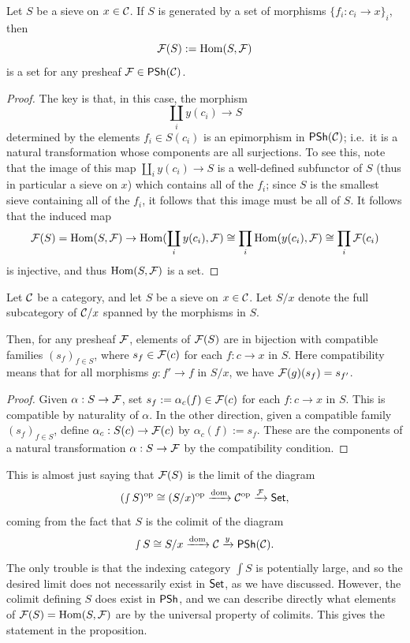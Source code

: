 \begin{proposition}\label{prop:chap:sheaves:sec:sites:FS is a set for small sieves}
    Let $S$ be a sieve on $x \in \catC$. If $S$ is generated by a set of morphisms $\{f_i : c_i \to x\}_i$, then
    \[\cal{F}(S) := \Hom(S,\cal{F})\]
    is a set for any presheaf $\cal{F} \in \PSh(\catC)$.
\end{proposition}
\begin{proof}
    The key is that, in this case, the morphism
    \[\coprod_i y(c_i) \to S\]
    determined by the elements $f_i \in S(c_i)$ is an epimorphism in $\PSh(\catC)$; i.e.\ it is a natural transformation whose components are all surjections. To see this, note that the image of this map $\coprod_i y(c_i) \to S$ is a well-defined subfunctor of $S$ (thus in particular a sieve on $x$) which contains all of the $f_i$; since $S$ is the smallest sieve containing all of the $f_i$, it follows that this image must be all of $S$. It follows that the induced map
    \[\cal{F}(S) = \Hom(S,\cal{F}) \to \Hom(\coprod_i y(c_i),\cal{F}) \cong \prod_i \Hom(y(c_i),\cal{F}) \cong \prod_i \cal{F}(c_i)\]
    is injective, and thus $\Hom(S,\cal{F})$ is a set.
\end{proof}

\begin{proposition}\label{prop:chap:sheaves:sec:sites:sheaf condition as limit}
    Let $\catC$ be a category, and let $S$ be a sieve on $x \in \catC$. Let $S/x$ denote the full subcategory of $\catC/x$ spanned by the morphisms in $S$.

    Then, for any presheaf $\cal{F}$, elements of $\cal{F}(S)$ are in bijection with compatible families $(s_f)_{f \in S}$, where $s_f \in \cal{F}(c)$ for each $f : c \to x$ in $S$. Here compatibility means that for all morphisms $g : f' \to f$ in $S/x$, we have $\cal{F}(g)(s_f) = s_{f'}$.
\end{proposition}
\begin{proof}
    Given $\alpha : S \to \cal{F}$, set $s_f := \alpha_c(f) \in \cal{F}(c)$ for each $f : c \to x$ in $S$. This is compatible by naturality of $\alpha$. In the other direction, given a compatible family $(s_f)_{f \in S}$, define $\alpha_c : S(c) \to \cal{F}(c)$ by $\alpha_c(f) := s_f$. These are the components of a natural transformation $\alpha : S \to \cal{F}$ by the compatibility condition.
\end{proof}

This is almost just saying that $\cal{F}(S)$ is the limit of the diagram
\[(\smallint S)^\op \cong (S/x)^\op \xrightarrow{\dom} \catC^\op \xrightarrow{\cal{F}} \Set,\]
coming from the fact that $S$ is the colimit of the diagram
\[\smallint S \cong S/x \xrightarrow{\dom} \catC \xrightarrow{y} \PSh(\catC).\]
The only trouble is that the indexing category $\int S$ is potentially large, and so the desired limit does not necessarily exist in $\Set$, as we have discussed. However, the colimit defining $S$ does exist in $\PSh$, and we can describe directly what elements of $\cal{F}(S) = \Hom(S,\cal{F})$ are by the universal property of colimits. This gives the statement in the proposition.

